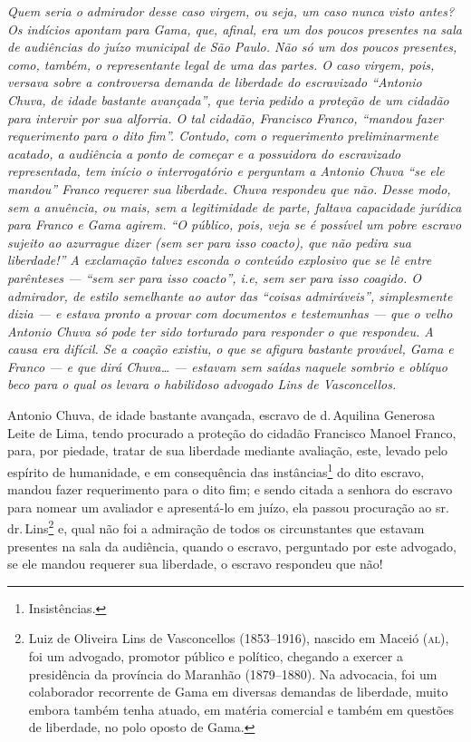\begin{didascalia}
\emph{Quem seria o admirador desse caso virgem, ou seja, um caso nunca
visto antes? Os indícios apontam para Gama, que, afinal, era um dos
poucos presentes na sala de audiências do juízo municipal de São Paulo.
Não só um dos poucos presentes, como, também, o representante legal de
uma das partes. O caso virgem, pois, versava sobre a controversa demanda
de liberdade do escravizado ``Antonio Chuva, de idade bastante avançada'',
que teria pedido a proteção de um cidadão para intervir por sua
alforria. O tal cidadão, Francisco Franco, ``mandou fazer requerimento
para o dito fim''. Contudo, com o requerimento preliminarmente acatado, a
audiência a ponto de começar e a possuidora do escravizado representada,
tem início o interrogatório e perguntam a Antonio Chuva ``se ele mandou''
Franco requerer sua liberdade. Chuva respondeu que não. Desse modo, sem
a anuência, ou mais, sem a legitimidade de parte, faltava capacidade
jurídica para Franco e Gama agirem. ``O público, pois, veja se é possível
um pobre escravo sujeito ao azurrague dizer (sem ser para isso coacto),
que não pedira sua liberdade!'' A exclamação talvez esconda o conteúdo
explosivo que se lê entre parênteses --- ``sem ser para isso coacto'', i.e,
sem ser para isso coagido. O admirador, de estilo semelhante ao autor
das ``coisas admiráveis'', simplesmente dizia --- e estava pronto a provar
com documentos e testemunhas --- que o velho Antonio Chuva só pode ter
sido torturado para responder o que respondeu. A causa era difícil. Se a
coação existiu, o que se afigura bastante provável, Gama e Franco --- e
que dirá Chuva\ldots{} --- estavam sem saídas naquele sombrio e oblíquo beco
para o qual os levara o habilidoso advogado Lins de Vasconcellos.}
\end{didascalia}

Antonio Chuva, de idade bastante avançada, escravo de d.\,Aquilina
Generosa Leite de Lima, tendo procurado a proteção do cidadão Francisco
Manoel Franco, para, por piedade, tratar de sua liberdade mediante
avaliação, este, levado pelo espírito de humanidade, e em consequência
das instâncias\footnote{ Insistências.} do dito escravo, mandou fazer
requerimento para o dito fim; e sendo citada a senhora do escravo para
nomear um avaliador e apresentá-lo em juízo, ela passou procuração ao
sr.\,dr.\,Lins\footnote{ Luiz de Oliveira Lins de Vasconcellos
  (1853--1916), nascido em Maceió (\textsc{al}), foi um advogado, promotor público
  e político, chegando a exercer a presidência da província do Maranhão
  (1879--1880). Na advocacia, foi um colaborador recorrente de Gama em
  diversas demandas de liberdade, muito embora também tenha atuado, em
  matéria comercial e também em questões de liberdade, no polo oposto de
  Gama.} e, qual não foi a admiração de todos os circunstantes que
estavam presentes na sala da audiência, quando o escravo, perguntado por
este advogado, se ele mandou requerer sua liberdade, o escravo respondeu
que não!

